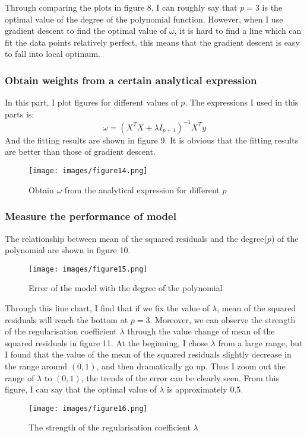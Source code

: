 \documentclass[a4paper, 12pt]{article}
\begin{document}
    Through comparing the plots in figure 8, I can roughly say that $p=3$ is the optimal value of the degree of the polynomial function. However, when I use gradient descent to find the optimal value of $\omega$, it is hard to find a line which can fit the data points relatively perfect, this means that the gradient descent is easy to fall into local optimum.

  \subsubsection{Obtain weights from a certain analytical expression}
    In this part, I plot figures for different values of $p$. The expressions I used in this parts is:
    \begin{equation*}
      \omega = (X^TX + \lambda I_{p+1})^{-1} X^Ty
    \end{equation*}
    And the fitting results are shown in figure 9. It is obvious that the fitting results are better than those of gradient descent.
    \begin{figure}[h]
      \centering
      \texttt{[image: images/figure14.png]}
      \caption{Obtain $\omega$ from the analytical expression for different $p$}
    \end{figure}

    \subsubsection{Measure the performance of model}
    The relationship between mean of the squared residuals and the degree($p$) of the polynomial are shown in figure 10.
    \begin{figure}[h]
      \centering
      \texttt{[image: images/figure15.png]}
      \caption{Error of the model with the degree of the polynomial}
    \end{figure}
    Through this line chart, I find that if we fix the value of $\lambda$, mean of the squared residuals will reach the bottom at $p=3$.
    Moreover, we can observe the strength of the regularisation coefficient $\lambda$ through the value change of mean of the squared residuals in figure 11.
    At the beginning, I chose $\lambda$ from a large range, but I found that the value of the mean of the squared residuals slightly decrease in the range around $(0,1)$, and then dramatically go up. Thus I zoom out the range of $\lambda$ to $(0,1)$, the trends of the error can be clearly seen. From this figure, I can say that the optimal value of $\lambda$ is approximately 0.5.
    \begin{figure}[h]
      \centering
      \texttt{[image: images/figure16.png]}
      \caption{The strength of the regularisation coefficient $\lambda$}
    \end{figure}
    
\end{document}
